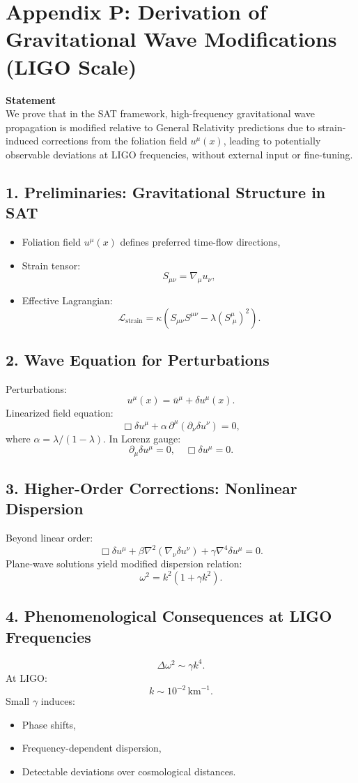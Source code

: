 \documentclass[12pt]{article}
\begin{document}
\newpage
\section*{Appendix P: Derivation of Gravitational Wave Modifications (LIGO Scale)}

\textbf{Statement} \\
We prove that in the SAT framework, high-frequency gravitational wave propagation is modified relative to General Relativity predictions due to strain-induced corrections from the foliation field \(u^\mu(x)\), leading to potentially observable deviations at LIGO frequencies, without external input or fine-tuning.

\subsection*{1. Preliminaries: Gravitational Structure in SAT}
\begin{itemize}
    \item Foliation field \(u^\mu(x)\) defines preferred time-flow directions,
    \item Strain tensor:
    \[
    S_{\mu\nu} = \nabla_\mu u_\nu,
    \]
    \item Effective Lagrangian:
    \[
    \mathcal{L}_\text{strain} = \kappa \left( S_{\mu\nu} S^{\mu\nu} - \lambda (S^\mu_{\;\mu})^2 \right).
    \]
\end{itemize}

\subsection*{2. Wave Equation for Perturbations}
Perturbations:
\[
u^\mu(x) = \bar{u}^\mu + \delta u^\mu(x).
\]
Linearized field equation:
\[
\Box \delta u^\mu + \alpha \, \partial^\mu (\partial_\nu \delta u^\nu) = 0,
\]
where \(\alpha = \lambda / (1 - \lambda)\).
In Lorenz gauge:
\[
\partial_\mu \delta u^\mu = 0, \quad \Box \delta u^\mu = 0.
\]

\subsection*{3. Higher-Order Corrections: Nonlinear Dispersion}
Beyond linear order:
\[
\Box \delta u^\mu + \beta \nabla^2 (\nabla_\nu \delta u^\nu) + \gamma \nabla^4 \delta u^\mu = 0.
\]
Plane-wave solutions yield modified dispersion relation:
\[
\omega^2 = k^2 (1 + \gamma k^2).
\]

\subsection*{4. Phenomenological Consequences at LIGO Frequencies}
\[
\Delta \omega^2 \sim \gamma k^4.
\]
At LIGO:
\[
k \sim 10^{-2} \, \text{km}^{-1}.
\]
Small \(\gamma\) induces:
\begin{itemize}
    \item Phase shifts,
    \item Frequency-dependent dispersion,
    \item Detectable deviations over cosmological distances.
\end{itemize}
\end{document}
